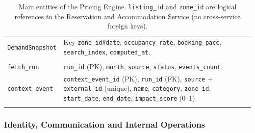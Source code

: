 \begin{longtable}{@{}L{3.8cm}L{10.0cm}@{}}
\texttt{DemandSnapshot} & Key \texttt{zone\_id\#date}; \texttt{occupancy\_\allowbreak rate},
  \texttt{booking\_pace}, \texttt{search\_index}, \texttt{computed\_at}. \\
\addlinespace
{} \\
\texttt{fetch\_run} & \texttt{run\_id} (PK), \texttt{month}, \texttt{source},
  \texttt{status}, \texttt{events\_count}. \\
\texttt{context\_event} & \texttt{context\_\allowbreak event\_id} (PK), \texttt{run\_id} (FK),
  \texttt{source} + \texttt{external\_id} (unique), \texttt{name},
  \texttt{category}, \texttt{zone\_id}, \texttt{start\_date},
  \texttt{end\_date}, \texttt{impact\_\allowbreak score} (0--1). \\
\bottomrule
\caption{Main entities of the Pricing Engine. \texttt{listing\_id} and
\texttt{zone\_id} are logical references to the Reservation and Accommodation
Service (no cross-service foreign keys).}
\label{tab:price-model}
\end{longtable}
\endgroup

\begingroup
\setlength{\emergencystretch}{3em}
\subsubsection{Identity, Communication and Internal Operations}
\label{sec:id-model}

